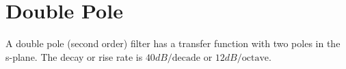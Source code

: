 \section{Double Pole}
A double pole (second order) filter has a transfer function with
two poles in the s-plane. The decay or rise rate is \(40 dB/\text{decade}\)
or \(12 dB/\text{octave}\).



